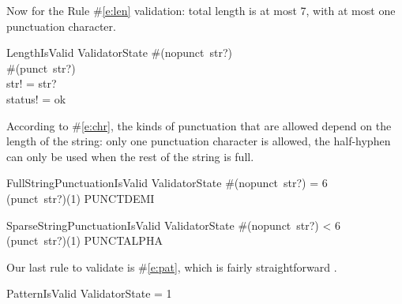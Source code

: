 \documentclass[11pt]{article}
\begin{document}
\begin{spec}
  Now for the Rule \#\ref{e:len} validation: total length is at most 7, with at most one punctuation
  character.

  \begin{schema}{LengthIsValid}
    ValidatorState
    \where
    \#(nopunct~str?)  \\
    \#(punct~str?)  \\
    str! = str? \\
    status! = ok
  \end{schema}

  According to \#\ref{e:chr}, the kinds of punctuation that are allowed depend on the length of the
  string: only one punctuation character is allowed, the half-hyphen can only be used when the rest
  of the string is full.

  \begin{schema}{FullStringPunctuationIsValid}
    ValidatorState
    \where
    \#(nopunct~str?) = 6 \\
    (punct~str?)(1) \in PUNCTDEMI
  \end{schema}
    
  \begin{schema}{SparseStringPunctuationIsValid}
    ValidatorState
    \where
    \#(nopunct~str?) < 6 \\
    (punct~str?)(1) \in PUNCTALPHA
  \end{schema}

  Our last rule to validate is \#\ref{e:pat}, which is fairly straightforward \tofinish.

  \begin{schema}{PatternIsValid}
    ValidatorState
     = 1
  \end{schema}
  
\end{spec}
\end{document}
